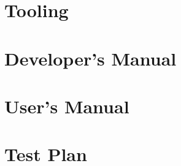 \documentclass[hidelinks, 12pt]{article} %
\begin{document}
		\begin{appendices}
			\newpage
			\section{Tooling}
			\label{Tooling}
			
			\pagebreak
			
			\newpage
			\section{Developer’s Manual}
			\label{Developer’s Manual}
			
			\pagebreak
			
			\newpage
			\section{User’s Manual}
			\label{User’s Manual}
			
			\pagebreak
			
			\newpage
			\section{Test Plan}
			\label{Test Plan}
			
			\pagebreak
		\end{appendices}
		
		
	
\end{document}
